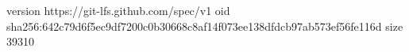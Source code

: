 version https://git-lfs.github.com/spec/v1
oid sha256:642c79d6f5ec9df7200c0b30668c8af14f073ee138dfdcb97ab573ef56fe116d
size 39310
